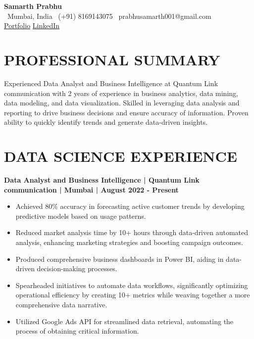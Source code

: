 \documentclass{article}
\begin{document}
\begin{center}
    \textbf{\Huge Samarth Prabhu} \\
    \vspace{2mm}
    \faMapMarker \ Mumbai, India \quad
    \faPhone \ (+91) 8169143075 \quad
    \faEnvelope \ prabhusamarth001@gmail.com \\
    \href{https://samarth745.github.io/Portfolio-Website/}{Portfolio} \quad 
    \href{https://in.linkedin.com/in/samarth-prabhu}{LinkedIn} %
\end{center}

\section*{PROFESSIONAL SUMMARY}
Experienced Data Analyst and Business Intelligence at Quantum Link communication with 2 years of experience in business analytics, data mining, data modeling, and data visualization. Skilled in leveraging data analysis and reporting to drive business decisions and ensure accuracy of information. Proven ability to quickly identify trends and generate data-driven insights.

\section*{DATA SCIENCE EXPERIENCE}
\textbf{Data Analyst and Business Intelligence | Quantum Link communication | Mumbai | August 2022 - Present}
\begin{itemize}[leftmargin=*]
    \item Achieved 80\% accuracy in forecasting active customer trends by developing predictive models based on usage patterns.
    \item Reduced market analysis time by 10+ hours through data-driven automated analysis, enhancing marketing strategies and boosting campaign outcomes.
    \item Produced comprehensive business dashboards in Power BI, aiding in data-driven decision-making processes.
    \item Spearheaded initiatives to automate data workflows, significantly optimizing operational efficiency by creating 10+ metrics while weaving together a more comprehensive data narrative.
    \item Utilized Google Ads API for streamlined data retrieval, automating the process of obtaining critical information.
\end{itemize}
\end{document}
